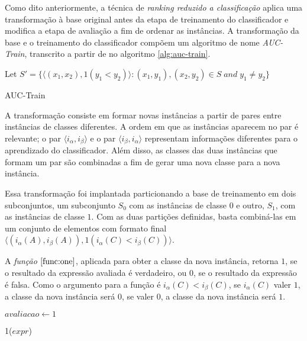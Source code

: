 Como dito anteriormente, a técnica de \emph{ranking reduzido a classificação} aplica uma transformação à base original antes da etapa de treinamento do classificador e modifica a etapa de avaliação a fim de ordenar as instâncias. A transformação da base e o treinamento do classificador compõem um algoritmo de nome \emph{AUC-Train}, transcrito a partir de \cite{langford08} no algoritmo \ref{alg:auc-train}.

\begin{algorithm}[h!]
    Let $S' = \{\langle (x_1, x_2), 1(y_1 < y_2) \rangle : (x_1, y_1), (x_2, y_2) \in S \; and \;  y_1 \neq y_2\}$\;
    
    \caption{AUC-Train}
    \label{alg:auc-train}
\end{algorithm}

A transformação consiste em formar novas instâncias a partir de pares entre instâncias de classes diferentes. A ordem em que as instâncias aparecem no par é relevante; o par $\langle i_{\alpha}, i_{\beta} \rangle$ e o par $\langle i_{\beta}, i_{\alpha} \rangle$ representam informações diferentes para o aprendizado do classificador. Além disso, as classes das duas instâncias que formam um par são combinadas a fim de gerar uma nova classe para a nova instância.

Essa transformação foi implantada particionando a base de treinamento em dois subconjuntos, um subconjunto $S_0$ com as instâncias de classe $0$ e outro, $S_1$, com as instâncias de classe $1$. Com as duas partições definidas, basta combiná-las em um conjunto de elementos com formato final $\langle (i_{\alpha}(A), i_{\beta}(A)), 1(i_{\alpha}(C) < i_{\beta}(C)) \rangle$.

A \emph{função $\ref{func:one}$}, aplicada para obter a classe da nova instância, retorna $1$, se o resultado da expressão avaliada é verdadeiro, ou $0$, se o resultado da expressão é falsa. Como o argumento para a função é $i_{\alpha}(C) < i_{\beta}(C)$, se $i_{\alpha}(C)$ valer $1$, a classe da nova instância será $0$, se valer $0$, a classe da nova instância será $1$.

\begin{function}[h!]
    $avaliacao \gets 1$\;



    \caption{1($expr$)}
    \label{func:one}
\end{function}

